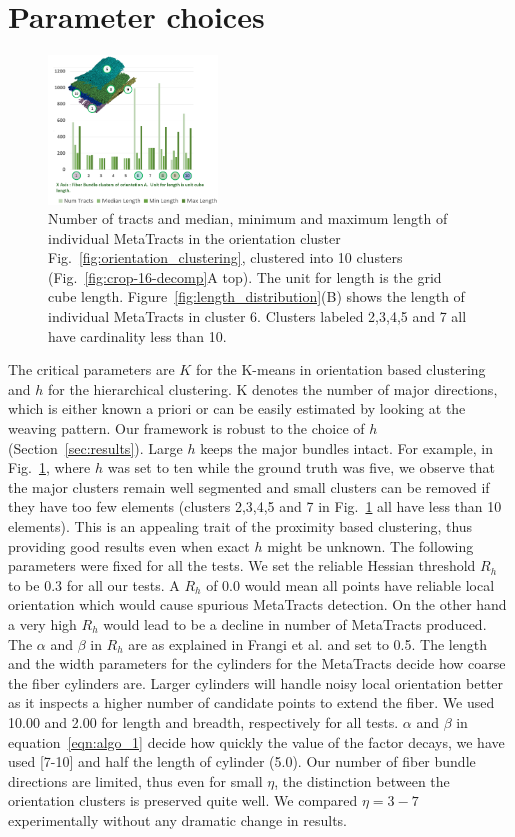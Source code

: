 \section{Parameter choices}
\label{sec:param_choices}
\begin{figure}
\centering
	\includegraphics[width=0.4\textwidth]{imagesMT2014/crop-16/histogram_10_A.PNG}
	\caption{Number of tracts and median, minimum and maximum length of individual MetaTracts in the orientation cluster Fig.~\ref{fig:orientation_clustering}, clustered into 10 clusters (Fig.~\ref{fig:crop-16-decomp}A top). The unit for length is the grid cube length. Figure~\ref{fig:length_distribution}(B) shows the length of individual MetaTracts in cluster 6. Clusters labeled 2,3,4,5 and 7 all have cardinality less than 10. }
	\label{fig:len_dist_crop16}
\end{figure}
The critical parameters are $K$ for the K-means in orientation based clustering and $h$ for the hierarchical clustering. K denotes the number of major directions, which is either known a priori or can be easily estimated by looking at the weaving pattern. 
Our framework is robust to the choice of $h$ (Section~\ref{sec:results}). Large $h$ keeps the major bundles intact. For example, in  Fig.~\ref{fig:len_dist_crop16}, where $h$ was set to ten while the ground truth was five, we observe that the major clusters remain well segmented and small clusters can be removed if they have too few elements (clusters 2,3,4,5 and 7 in Fig.~\ref{fig:len_dist_crop16} all have less than 10 elements). This is an appealing trait of the proximity based clustering, thus providing good results even when exact $h$ might be unknown.
The following parameters were fixed for all the tests. We set the reliable Hessian threshold $R_{h}$ to be 0.3 for all our tests. A $R_{h}$ of 0.0 would mean all points have reliable local orientation which would cause spurious MetaTracts detection. On the other hand a very high $ R_{h}$ would lead to be a decline in number of MetaTracts produced. The $\alpha$ and $\beta$ in $R_{h}$ are as explained in Frangi et al. \cite{Frangi1998} and set to 0.5. The length and the width parameters for the cylinders for the MetaTracts decide how coarse the fiber cylinders are. Larger cylinders will handle noisy local orientation better as it inspects a higher number of candidate points to extend the fiber. We used 10.00 and 2.00 for length and breadth, respectively for all tests. $\alpha$ and $\beta$ in equation~\ref{eqn:algo_1} decide how quickly the value of the factor decays, we have used [7-10] and half the length of cylinder (5.0). Our number of fiber bundle directions are limited, thus even for small $\eta$, the distinction between the orientation clusters is preserved quite well. We compared  $\eta=3-7$ experimentally without any dramatic change in results. 
